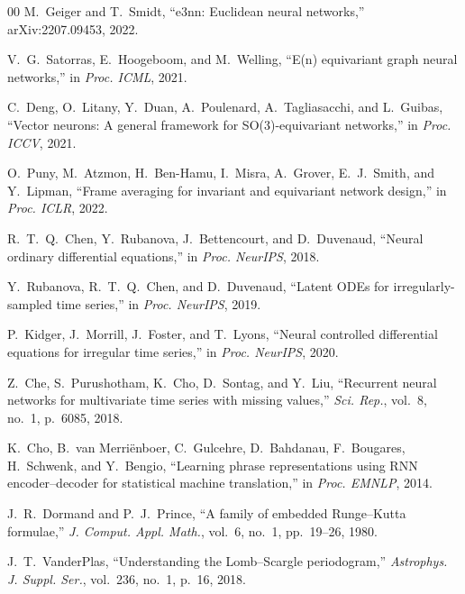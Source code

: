 \documentclass[10pt,journal]{IEEEtran}
\begin{document}
\begin{thebibliography}{00}
M.~Geiger and T.~Smidt,
``e3nn: Euclidean neural networks,''
arXiv:2207.09453, 2022.

V.~G.~Satorras, E.~Hoogeboom, and M.~Welling,
``E(n) equivariant graph neural networks,''
in \textit{Proc. ICML}, 2021.

C.~Deng, O.~Litany, Y.~Duan, A.~Poulenard, A.~Tagliasacchi, and L.~Guibas,
``Vector neurons: A general framework for SO(3)-equivariant networks,''
in \textit{Proc. ICCV}, 2021.

O.~Puny, M.~Atzmon, H.~Ben-Hamu, I.~Misra, A.~Grover, E.~J.~Smith, and Y.~Lipman,
``Frame averaging for invariant and equivariant network design,''
in \textit{Proc. ICLR}, 2022.

R.~T.~Q.~Chen, Y.~Rubanova, J.~Bettencourt, and D.~Duvenaud,
``Neural ordinary differential equations,''
in \textit{Proc. NeurIPS}, 2018.

Y.~Rubanova, R.~T.~Q.~Chen, and D.~Duvenaud,
``Latent ODEs for irregularly-sampled time series,''
in \textit{Proc. NeurIPS}, 2019.

P.~Kidger, J.~Morrill, J.~Foster, and T.~Lyons,
``Neural controlled differential equations for irregular time series,''
in \textit{Proc. NeurIPS}, 2020.

Z.~Che, S.~Purushotham, K.~Cho, D.~Sontag, and Y.~Liu,
``Recurrent neural networks for multivariate time series with missing values,''
\textit{Sci. Rep.}, vol.~8, no.~1, p.~6085, 2018.

K.~Cho, B.~van Merri\"{e}nboer, C.~Gulcehre, D.~Bahdanau, F.~Bougares, H.~Schwenk, and Y.~Bengio,
``Learning phrase representations using RNN encoder--decoder for statistical machine translation,''
in \textit{Proc. EMNLP}, 2014.

J.~R.~Dormand and P.~J.~Prince,
``A family of embedded Runge--Kutta formulae,''
\textit{J. Comput. Appl. Math.}, vol.~6, no.~1, pp.~19--26, 1980.

J.~T.~VanderPlas,
``Understanding the Lomb--Scargle periodogram,''
\textit{Astrophys. J. Suppl. Ser.}, vol.~236, no.~1, p.~16, 2018.

\end{thebibliography}
\end{document}
